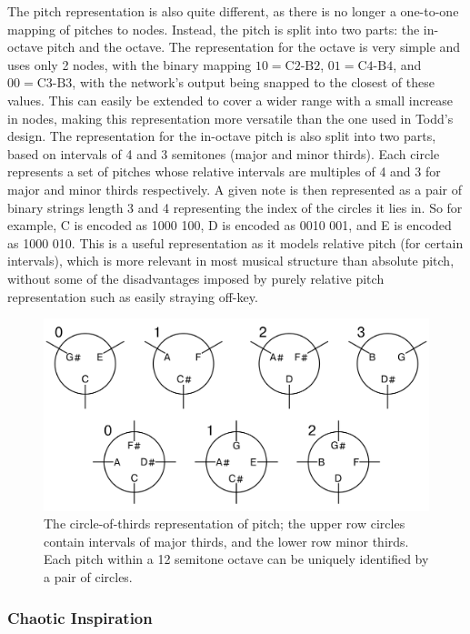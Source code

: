 \documentclass[ author={Stephen Livermore-Tozer},
				supervisor={Dr. Peter Flach},
				degree={MEng},
				title={Algorithmic Co-composition Using Machine Learning},
				subtitle={},
				type={research},
				year={2016} ]{dissertation}
\begin{document}
	The pitch representation is also quite different, as there is no longer a one-to-one mapping of pitches to nodes. Instead, the pitch is split into two parts: the in-octave pitch and the octave. The representation for the octave is very simple and uses only 2 nodes, with the binary mapping $10 = \text{C2-B2}$, $01 = \text{C4-B4}$, and $00 = \text{C3-B3}$, with the network's output being snapped to the closest of these values. This can easily be extended to cover a wider range with a small increase in nodes, making this representation more versatile than the one used in Todd's design. The representation for the in-octave pitch is also split into two parts, based on intervals of 4 and 3 semitones (major and minor thirds). Each circle represents a set of pitches whose relative intervals are multiples of 4 and 3 for major and minor thirds respectively. A given note is then represented as a pair of binary strings length 3 and 4 representing the index of the circles it lies in. So for example, C is encoded as 1000 100, D is encoded as 0010 001, and E is encoded as 1000 010. This is a useful representation as it models relative pitch (for certain intervals), which is more relevant in most musical structure than absolute pitch, without some of the disadvantages imposed by purely relative pitch representation such as easily straying off-key. 
	
	\begin{figure}[h]
		\centering
		\includegraphics[width=1.0\textwidth]{circles-of-thirds}
		\caption{The circle-of-thirds representation of pitch; the upper row circles contain intervals of major thirds, and the lower row minor thirds. Each pitch within a 12 semitone octave can be uniquely identified by a pair of circles.}
	\end{figure}
	
	\subsubsection{Chaotic Inspiration}
	\label{sec:chaotic-inspiration}
	
\end{document}
